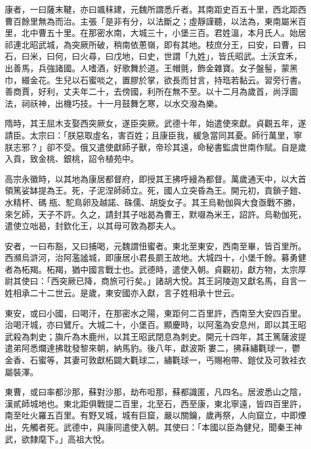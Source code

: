 
\begin{pinyinscope}

 康者，一曰薩末鞬，亦曰颯秣建，元魏所謂悉斤者。其南距史百五十里，西北距西曹百餘里無為而治。主張「是非有分，以法斷之；虛靜謹聽，以法為，東南屬米百里，北中曹五十里。在那密水南，大城三十，小堡三百。君姓溫，本月氏人。始居祁連北昭武城，為突厥所破，稍南依蔥嶺，即有其地。枝庶分王，曰安，曰曹，曰石，曰米，曰何，曰火尋，曰戊地，曰史，世謂「九姓」，皆氏昭武。土沃宜禾，出善馬，兵強諸國。人嗜酒，好歌舞於道。王帽氈，飾金雜寶。女子盤髻，蒙黑巾，綴金花。生兒以石蜜啖之，置膠於掌，欲長而甘言，持珤若黏云。習旁行書。善商賈，好利，丈夫年二十，去傍國，利所在無不至。以十二月為歲首，尚浮圖法，祠祅神，出機巧技。十一月鼓舞乞寒，以水交潑為樂。



 隋時，其王屈木支娶西突厥女，遂臣突厥。武德十年，始遣使來獻。貞觀五年，遂請臣。太宗曰：「朕惡取虛名，害百姓；且康臣我，緩急當同其憂。師行萬里，寧朕志邪？」卻不受。俄又遣使獻師子獸，帝珍其遠，命秘書監虞世南作賦。自是歲入貢，致金桃、銀桃，詔令植苑中。



 高宗永徽時，以其地為康居都督府，即授其王拂呼縵為都督。萬歲通天中，以大首領篤娑缽提為王。死，子泥涅師師立。死，國人立突昏為王。開元初，貢鎖子鎧、水精杯、碼瓶、駝鳥卵及越諾、硃儒、胡旋女子。其王烏勒伽與大食亟戰不勝，來乞師，天子不許。久之，請封其子咄曷為曹王，默啜為米王，詔許。烏勒伽死，遣使立咄曷，封欽化王，以其母可敦為郡夫人。



 安者，一曰布豁，又曰捕喝，元魏謂忸蜜者。東北至東安，西南至畢，皆百里所。西瀕烏滸河，治阿濫謐城，即康居小君長罽王故地。大城四十，小堡千餘。募勇健者為柘羯。柘羯，猶中國言戰士也。武德時，遣使入朝。貞觀初，獻方物，太宗厚尉其使曰：「西突厥已降，商旅可行矣。」諸胡大悅。其王訶陵迦又獻名馬，自言一姓相承二十二世云。是歲，東安國亦入獻，言子姓相承十世云。



 東安，或曰小國，曰喝汗，在那密水之陽，東距何二百里許，西南至大安四百里。治喝汗城，亦曰鷿斤。大城二十，小堡百。顯慶時，以阿濫為安息州，即以其王昭武殺為刺史；旟斤為木鹿州，以其王昭武閉息為刺史。開元十四年，其王篤薩波提遣弟阿悉爛達拂耽發黎來朝，納馬豹。後八年，獻波斯婁二，拂菻繡氍球一，鬱金香、石蜜等，其妻可敦獻柘闢大氍球二，繡氍球一，丐賜袍帶、鎧仗及可敦袿衣屬裝澤。



 東曹，或曰率都沙那，蘇對沙那，劫布呾那，蘇都識匿，凡四名。居波悉山之陰，漢貳師城地也。東北距俱戰提二百里，北至石，西至康，東北寧遠，皆四百里許，南至吐火羅五百里。有野叉城，城有巨窟，嚴以關鑰，歲再祭，人向窟立，中即煙出，先觸者死。武德中，與康同遣使入朝。其使曰：「本國以臣為健兒，聞秦王神武，欲隸麾下。」高祖大悅。




\end{pinyinscope}
